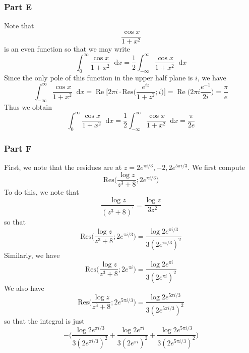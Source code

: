 \documentclass[12pt]{article}
\newcommand*\diff{\mathop{}\!\mathrm{d}}
\DeclareMathOperator{\re}{Re}
\begin{document}
\subsubsection*{Part E}
Note that 
\[
\frac{\cos x}{1+x^2}
\] is an even function so that we may write
\[
\int_0^\infty \frac{\cos x}{1+x^2} \diff x = \frac{1}{2} \int_{-\infty}^\infty \frac{\cos x}{1+x^2} \diff x
\] Since the only pole of this function in the upper half plane is $i$, we have
\[
\int_{-\infty}^\infty \frac{\cos x}{1+x^2} \diff x = \re \Bigg[ 2\pi i \cdot \text{Res}\bigg(\frac{e^{iz}}{1+z^2}; i \bigg) \Bigg] = \re\bigg(2\pi i \frac{e^{-1}}{2i}\bigg) = \frac{\pi}{e}
\] Thus we obtain 
\[
\int_0^\infty \frac{\cos x}{1+x^2} \diff x = \frac{1}{2} \int_{-\infty}^\infty \frac{\cos x}{1+x^2} \diff x = \frac{\pi}{2e} 
\]
\subsubsection*{Part F}
First, we note that the residues are at $z = 2e^{\pi i /3}, -2, 2e^{5\pi i / 3}$. We first compute
\[
\text{Res}\bigg(\frac{\log z}{z^3 + 8}; 2e^{\pi i /3}\bigg)
\] To do this, we note that
\[
\frac{\log z}{(z^3+8)^\prime} = \frac{\log z}{3z^2}  
\] so that
\[
\text{Res}\bigg(\frac{\log z}{z^3 + 8}; 2e^{\pi i /3}\bigg) = \frac{\log 2e^{\pi i /3}}{3(2e^{\pi i/3})^2}
\] Similarly, we have
\[
\text{Res}\bigg(\frac{\log z}{z^3 + 8}; 2e^{\pi i}\bigg) = \frac{\log 2e^{\pi i}}{3(2e^{\pi i})^2}
\] We also have
\[
\text{Res}\bigg(\frac{\log z}{z^3 + 8}; 2e^{5 \pi i / 3}\bigg) = \frac{\log 2e^{5 \pi i/3}}{3(2e^{5 \pi i /3})^2}
\] so that the integral is just
\[
-\bigg(\frac{\log 2e^{\pi i /3}}{3(2e^{\pi i/3})^2} + \frac{\log 2e^{\pi i}}{3(2e^{\pi i})^2} + \frac{\log 2e^{5 \pi i/3}}{3(2e^{5 \pi i /3})^2} \bigg)
\]
\newpage
\end{document}
